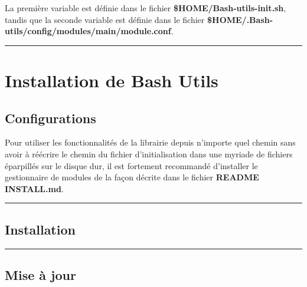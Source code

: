 \documentclass[a4paper,10pt]{article}
\begin{document}
\begin{justify}
    La première variable est définie dans le fichier \textbf{\color{lime}\$HOME/Bash-utils-init.sh}, tandis que la seconde variable est définie dans le fichier \textbf{\color{lime}\$HOME/.Bash-utils/config/modules/main/module.conf}.
\end{justify}





\color{red}\par\noindent\rule{\textwidth}{0.4pt}\color{white}

\color{red}
\section{Installation de Bash Utils}\color{white}

\color{green}
\subsection{Configurations}\color{white}

\begin{justify}
    Pour utiliser les fonctionnalités de la librairie depuis n'importe quel chemin sans avoir à réécrire le chemin du fichier d'initialisation dans une myriade de fichiers éparpillés sur le disque dur, il est fortement recommandé d'installer le gestionnaire de modules de la façon décrite dans le fichier \textbf{\color{lime}README INSTALL.md}.
\end{justify}




\color{green}\par\noindent\rule{\textwidth}{0.4pt}\color{white}

\color{green}
\subsection{Installation}\color{white}

\begin{justify}

\end{justify}




\color{green}\par\noindent\rule{\textwidth}{0.4pt}\color{white}

\color{green}
\subsection{Mise à jour}\color{white}

\begin{justify}

\end{justify}
\end{document}
